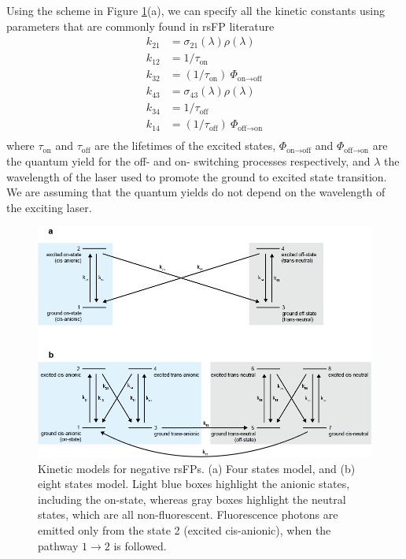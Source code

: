 \documentclass{article}
\begin{document}
Using the scheme in Figure \ref{fig:rsFP_kinetic_models}(a), we can specify all the kinetic constants using parameters that are commonly found in rsFP literature
\begin{equation}\label{eq:rsFP_k_4states}
\begin{aligned}
    k_{21} &= \sigma_{21}(\lambda) \rho(\lambda) \\
    k_{12} &= 1 / \tau_{\text{on}} \\
    k_{32} &= (1 / \tau_{\text{on}}) \ \Phi_{\text{on} \rightarrow \text{off}} \\
    k_{43} &= \sigma_{43}(\lambda) \rho(\lambda) \\
    k_{34} &= 1/ \tau_{\text{off}} \\
    k_{14} &= (1 / \tau_{\text{off}}) \ \Phi_{\text{off} \rightarrow \text{on}}\\
\end{aligned}
\end{equation}
where $\tau_{\text{on}}$ and $\tau_{\text{off}}$ are the lifetimes of the excited states, $\Phi_{\text{on} \rightarrow \text{off}}$ and $\Phi_{\text{off} \rightarrow \text{on}}$ are the quantum yield for the off- and on- switching processes respectively, and $\lambda$ the wavelength of the laser used to promote the ground to excited state transition.
We are assuming that the quantum yields do not depend on the wavelength of the exciting laser.

\begin{figure}
    \label{fig:rsFP_kinetic_models}
    \centering
    \includegraphics[width=1\textwidth]{figures/rsFP_4states_8states_kinetic_models.png}
    \caption[Kinetic models for negative rsFPs]
    {Kinetic models for negative rsFPs. (a) Four states model, and (b) eight states model. Light blue boxes highlight the anionic states, including the on-state, whereas gray boxes highlight the neutral states, which are all non-fluorescent. Fluorescence photons are emitted only from the state 2 (excited cis-anionic), when the pathway $1\rightarrow2$ is followed.}
\end{figure}
\end{document}

